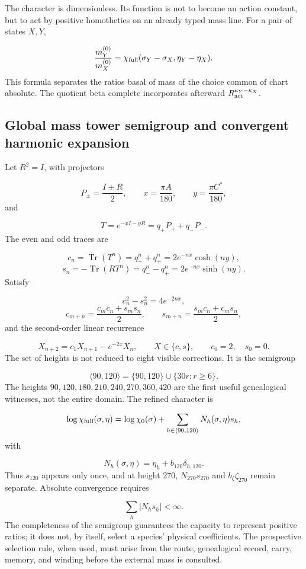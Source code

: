 The character is dimensionless. Its function is not to become an action constant, but to act by positive homotheties on an already typed mass line. For a pair of states \(X,Y\),

\[
\frac{m_Y^{(0)}}{m_X^{(0)}}
=\chi_{\rm full}(\sigma_Y-\sigma_X,\eta_Y-\eta_X).
\]
This formula separates the ratios basal of mass of the choice common of chart absolute. The quotient beta complete incorporates afterward \(R_{\rm act}^{\kappa_Y-\kappa_X}\).

\subsection{Global mass tower semigroup and convergent harmonic expansion}
Let \(R^2=I\), with projectors

\[
P_\pm=\frac{I\pm R}{2},
\qquad
x=\frac{\pi A}{180},
\qquad
y=\frac{\pi C^*}{180},
\]
and

\[
T=e^{-xI-yR}=q_+P_++q_-P_-.
\]
The even and odd traces are

\[
c_n=\operatorname{Tr}(T^n)=q_-^n+q_+^n
=2e^{-nx}\cosh(ny),
\]
\[
s_n=-\operatorname{Tr}(RT^n)=q_-^n-q_+^n
=2e^{-nx}\sinh(ny).
\]
Satisfy

\[
c_n^2-s_n^2=4e^{-2nx},
\]
\[
c_{m+n}=\frac{c_mc_n+s_ms_n}{2},
\qquad
s_{m+n}=\frac{s_mc_n+c_ms_n}{2},
\]
and the second-order linear recurrence

\[
X_{n+2}=c_1X_{n+1}-e^{-2x}X_n,
\qquad X\in\{c,s\},
\qquad c_0=2,\quad s_0=0.
\]
The set of heights is not reduced to eight visible corrections. It is the semigroup

\[
\langle90,120\rangle
=\{90,120\}\cup\{30r:r\ge6\}.
\]
The heights \(90,120,180,210,240,270,360,420\) are the first useful genealogical witnesses, not the entire domain. The refined character is

\[
\log\chi_{\rm full}(\sigma,\eta)
=\log\chi_0(\sigma)
+\sum_{h\in\langle90,120\rangle}N_h(\sigma,\eta)s_h,
\]
with

\[
N_h(\sigma,\eta)=\eta_h+b_{120}\delta_{h,120}.
\]
Thus \(s_{120}\) appears only once, and at height 270, \(N_{270}s_{270}\) and \(b_\zeta\zeta_{270}\) remain separate. Absolute convergence requires

\[
\sum_h |N_hs_h|<\infty.
\]
The completeness of the semigroup guarantees the capacity to represent positive ratios; it does not, by itself, select a species' physical coefficients. The prospective selection rule, when used, must arise from the route, genealogical record, carry, memory, and winding before the external mass is consulted.

